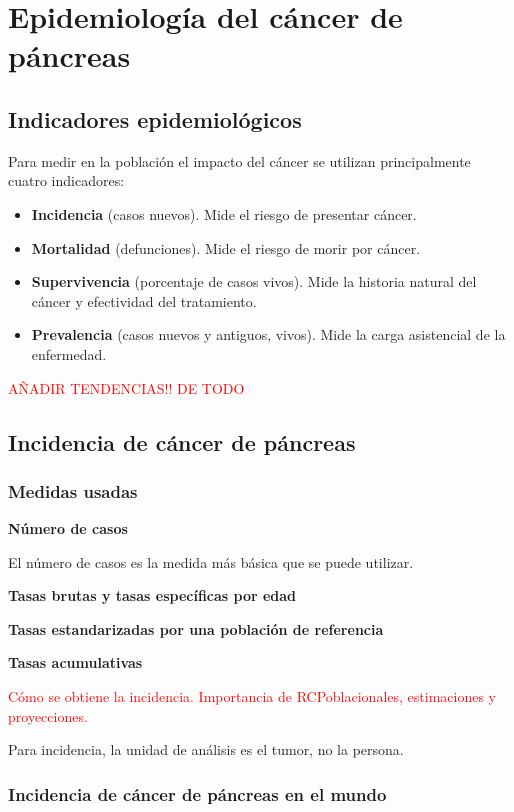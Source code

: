 \chapter{Epidemiología del cáncer de páncreas}

\section{Indicadores epidemiológicos}

Para medir en la población el impacto del cáncer se utilizan principalmente cuatro indicadores:

\begin{itemize}
	\item \textbf{Incidencia} (casos nuevos). Mide el riesgo de presentar cáncer.
	\item \textbf{Mortalidad} (defunciones). Mide el riesgo de morir por cáncer.
	\item \textbf{Supervivencia} (porcentaje de casos vivos). Mide la historia natural del cáncer y efectividad del tratamiento.
	\item \textbf{Prevalencia} (casos nuevos y antiguos, vivos). Mide la carga asistencial de la enfermedad.
\end{itemize}

\textcolor{red}{AÑADIR TENDENCIAS!! DE TODO}

\section{Incidencia de cáncer de páncreas}

\subsection{Medidas usadas}

\textbf{Número de casos}

El número de casos es la medida más básica que se puede utilizar.

\textbf{Tasas brutas y tasas específicas por edad}

\textbf{Tasas estandarizadas por una población de referencia}

\textbf{Tasas acumulativas}

\textcolor{red}{Cómo se obtiene la incidencia. Importancia de RCPoblacionales, estimaciones y proyecciones.}

Para incidencia, la unidad de análisis es el tumor, no la persona.

\subsection{Incidencia de cáncer de páncreas en el mundo}

